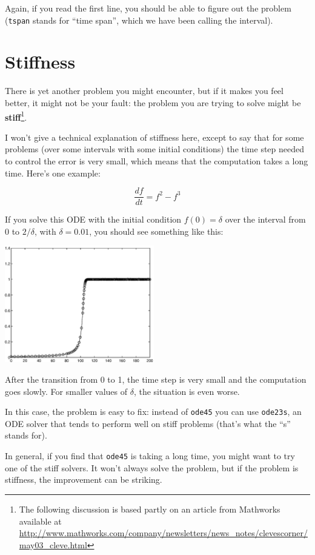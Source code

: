 \documentclass{book}
\begin{document}
Again, if you read the first line, you should be able to figure
out the problem ({\tt tspan} stands for ``time span'', which we
have been calling the interval).


\section{Stiffness}

There is yet another problem you might encounter, but if it makes you
feel better, it might not be your fault: the problem you are trying to
solve might be {\bf stiff}\footnote{The following discussion is based
partly on an article from Mathworks available at
\url{http://www.mathworks.com/company/newsletters/news_notes/clevescorner/may03_cleve.html}}.

I won't give a technical explanation of stiffness here, except
to say that for some problems (over some intervals with some initial
conditions) the time step needed to control the error is very small,
which means that the computation takes a long time.  Here's one
example:

\[ \frac{df}{dt} = f^2 - f^3 \]

If you solve this ODE with the initial condition $f(0) = \delta$ over
the interval from 0 to $2/\delta$, with $\delta = 0.01$, you should
see something like this:

\beforefig \centerline{\includegraphics[height=2in]{figs/stiff.eps}}

After the transition from 0 to 1, the time step is very small and the
computation goes slowly.  For smaller values of $\delta$, the
situation is even worse.

In this case, the problem is easy to fix: instead of {\tt ode45} you can
use {\tt ode23s}, an ODE solver that tends to perform well on stiff
problems (that's what the ``s'' stands for).

In general, if you find that {\tt ode45} is taking a long time, you
might want to try one of the stiff solvers.  It won't always solve
the problem, but if the problem is stiffness, the improvement can
be striking.
\end{document}
